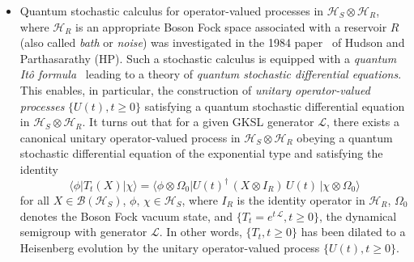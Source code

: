 \begin{itemize}
\item Quantum stochastic calculus for operator-valued processes in $\mathcal{H}_S\otimes\mathcal{H}_R$, where $\mathcal{H}_R$ is an appropriate Boson Fock space associated with a reservoir $R$ (also called {\it bath} or {\it noise}) was investigated in the 1984 paper~\cite{key7} of Hudson and Parthasarathy (HP). Such a stochastic calculus is equipped with a {\it quantum It{\^o} formula}~\cite{key7,key8} leading to a theory of {\it quantum stochastic differential equations}. This enables, in particular, the construction of {\it unitary operator-valued processes} $\{U(t), t\geq 0\}$ satisfying a quantum stochastic differential equation in $\mathcal{H}_S\otimes\mathcal{H}_R$. It turns out that for a given GKSL generator $\mathcal{L}$, there exists a canonical unitary operator-valued process in $\mathcal{H}_S\otimes\mathcal{H}_R$ obeying a quantum stochastic differential equation of the exponential type and satisfying the identity 
$$
\langle \phi\vert T_t(X)\vert \chi \rangle=\langle \phi\otimes \Omega_0\vert U(t)^\dag\, (X\otimes I_R)\, U(t)\,\vert \chi\otimes \Omega_0 \rangle
$$ 
for all $X\in \mathcal{B}(\mathcal{H}_S)$, $\phi,\, \chi\in \mathcal{H}_S$, where  $I_R$ is the identity operator in $\mathcal{H}_R$, $\Omega_0$ denotes the  Boson Fock vacuum state,  and $\{T_t=e^{t\,\mathcal{L}}, t\geq 0\}$, the dynamical semigroup with generator $\mathcal{L}$. In other words,  $\{T_t,t\geq 0\}$ has been dilated to a Heisenberg evolution by the unitary operator-valued process $\{U(t), t\geq 0\}$. 


\end{itemize}
